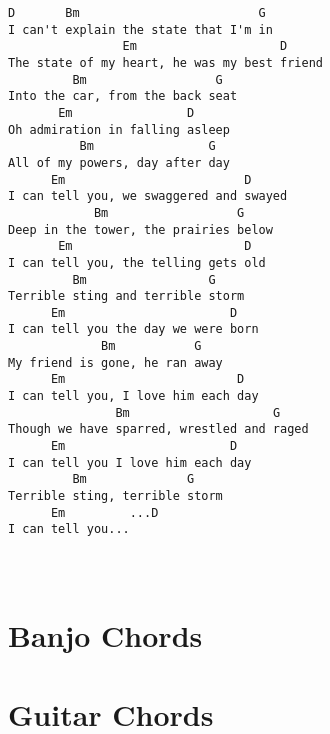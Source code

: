 \documentclass[leqno]{memoir}
\begin{document}
\begin{verbatim}
D       Bm                         G
I can't explain the state that I'm in
                Em                    D
The state of my heart, he was my best friend
         Bm                  G
Into the car, from the back seat
       Em                D
Oh admiration in falling asleep
          Bm                G
All of my powers, day after day
      Em                         D
I can tell you, we swaggered and swayed
            Bm                  G
Deep in the tower, the prairies below
       Em                        D
I can tell you, the telling gets old
         Bm                 G
Terrible sting and terrible storm
      Em                       D
I can tell you the day we were born
             Bm           G
My friend is gone, he ran away
      Em                        D
I can tell you, I love him each day
               Bm                    G
Though we have sparred, wrestled and raged
      Em                       D
I can tell you I love him each day
         Bm              G
Terrible sting, terrible storm
      Em         ...D
I can tell you...
\end{verbatim}
\newpage

\chapter{}
\begin{verbatim}

\end{verbatim}
\newpage



\chapter{Banjo Chords}

\newpage
\chapter{Guitar Chords}

\end{document}
